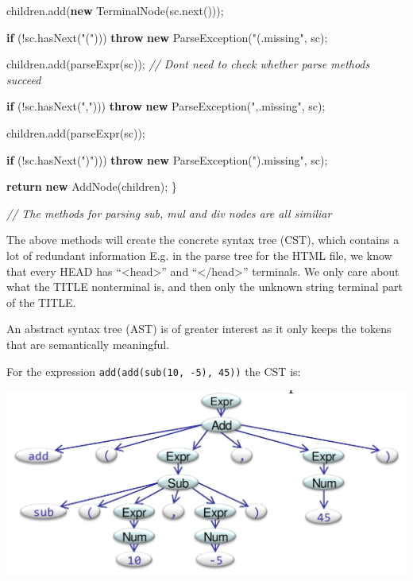 \documentclass[
]{book}
\newenvironment{Shaded}{\begin{snugshade}}{\end{snugshade}}
\newcommand{\BuiltInTok}[1]{#1}
\newcommand{\CommentTok}[1]{\textcolor[rgb]{0.56,0.35,0.01}{\textit{#1}}}
\newcommand{\FunctionTok}[1]{\textcolor[rgb]{0.00,0.00,0.00}{#1}}
\newcommand{\KeywordTok}[1]{\textcolor[rgb]{0.13,0.29,0.53}{\textbf{#1}}}
\newcommand{\NormalTok}[1]{#1}
\newcommand{\StringTok}[1]{\textcolor[rgb]{0.31,0.60,0.02}{#1}}
\begin{document}
\begin{Shaded}
\begin{Highlighting}[]
\NormalTok{  children.}\FunctionTok{add}\NormalTok{(}\KeywordTok{new} \FunctionTok{TerminalNode}\NormalTok{(sc.}\FunctionTok{next}\NormalTok{()));}
  
  \KeywordTok{if}\NormalTok{ (!sc.}\FunctionTok{hasNext}\NormalTok{(}\StringTok{"("}\NormalTok{)))}
    \KeywordTok{throw} \KeywordTok{new} \BuiltInTok{ParseException}\NormalTok{(}\StringTok{"(.missing"}\NormalTok{, sc);}
    
\NormalTok{  children.}\FunctionTok{add}\NormalTok{(}\FunctionTok{parseExpr}\NormalTok{(sc)); }\CommentTok{// Don\textquotesingle{}t need to check whether parse methods succeed}
  
  \KeywordTok{if}\NormalTok{ (!sc.}\FunctionTok{hasNext}\NormalTok{(}\StringTok{","}\NormalTok{)))}
    \KeywordTok{throw} \KeywordTok{new} \BuiltInTok{ParseException}\NormalTok{(}\StringTok{",.missing"}\NormalTok{, sc);}
    
\NormalTok{  children.}\FunctionTok{add}\NormalTok{(}\FunctionTok{parseExpr}\NormalTok{(sc));}
    
   \KeywordTok{if}\NormalTok{ (!sc.}\FunctionTok{hasNext}\NormalTok{(}\StringTok{")"}\NormalTok{)))}
    \KeywordTok{throw} \KeywordTok{new} \BuiltInTok{ParseException}\NormalTok{(}\StringTok{").missing"}\NormalTok{, sc);}
    
  \KeywordTok{return} \KeywordTok{new} \FunctionTok{AddNode}\NormalTok{(children);}
\NormalTok{\}}

\CommentTok{// The methods for parsing sub, mul and div nodes are all similiar}
\end{Highlighting}
\end{Shaded}

The above methods will create the {concrete syntax tree (CST)}, which contains a lot of redundant information E.g. in the parse tree for the HTML file, we know that every HEAD has ``\textless head\textgreater{}'' and ``\textless/head\textgreater{}'' terminals. We only care about what the TITLE nonterminal is, and then only the unknown string terminal part of the TITLE.

An {abstract syntax tree (AST)} is of greater interest as it only keeps the tokens that are semantically meaningful.

For the expression \texttt{add(add(sub(10,\ -5),\ 45))} the CST is:

\includegraphics{img/09-image08.png}
\end{document}
